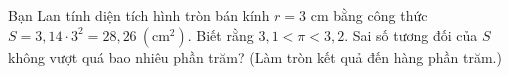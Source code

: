 \begin{ex}
Bạn Lan tính diện tích hình tròn bán kính $r=3$ cm bằng công thức $S=3{,}14\cdot3^2=28{,}26\ (\text{cm}^2)$. Biết rằng $3{,}1<\pi<3{,}2$. Sai số tương đối của $S$ không vượt quá bao nhiêu phần trăm? (Làm tròn kết quả đến hàng phần trăm.)
\end{ex}
